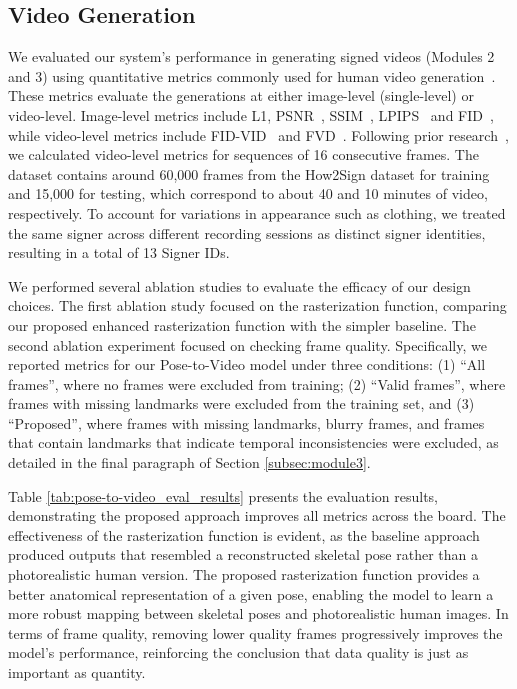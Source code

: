 \subsection{Video Generation}
\label{subsec:technical_eval_exp3}

We evaluated our system's performance in generating signed videos (Modules 2 and 3) using quantitative metrics commonly used for human video generation~\cite{wang2024disco}. These metrics evaluate the generations at either image-level (single-level) or video-level. Image-level metrics include L1, PSNR~\cite{hore2010image}, SSIM~\cite{wang2004image}, LPIPS~\cite{zhang2018unreasonable} and FID~\cite{heusel2017gans}, while video-level metrics include FID-VID~\cite{balaji2019conditional} and FVD~\cite{unterthiner2018towards}. Following prior research~\cite{wang2024disco}, we calculated video-level metrics for sequences of 16 consecutive frames. The dataset contains around 60,000 frames from the How2Sign dataset for training and 15,000 for testing, which correspond to about 40 and 10 minutes of video, respectively. To account for variations in appearance such as clothing, we treated the same signer across different recording sessions as distinct signer identities, resulting in a total of 13 Signer IDs.

We performed several ablation studies to evaluate the efficacy of our design choices. The first ablation study focused on the rasterization function, comparing our proposed enhanced rasterization function with the simpler baseline. The second ablation experiment focused on checking frame quality. Specifically, we reported metrics for our Pose-to-Video model under three conditions: (1) ``All frames'', where no frames were excluded from training; (2) ``Valid frames'', where frames with missing landmarks were excluded from the training set, and (3) ``Proposed'', where frames with missing landmarks, blurry frames, and frames that contain landmarks that indicate temporal inconsistencies were excluded, as detailed in the final paragraph of Section \ref{subsec:module3}. 



Table \ref{tab:pose-to-video_eval_results} presents the evaluation results, demonstrating the proposed approach improves all metrics across the board. The effectiveness of the rasterization function is evident, as the baseline approach produced outputs that resembled a reconstructed skeletal pose rather than a photorealistic human version. The proposed rasterization function provides a better anatomical representation of a given pose, enabling the model to learn a more robust mapping between skeletal poses and photorealistic human images. In terms of frame quality, removing lower quality frames progressively improves the model’s performance, reinforcing the conclusion that data quality is just as important as quantity. 

